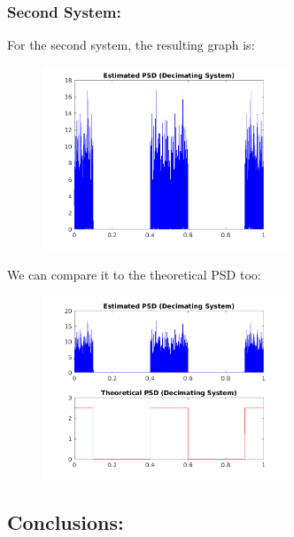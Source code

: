 \documentclass[a4paper,11pt]{article}
\begin{document}
\newpage

\subsubsection{Second System:}

For the second system, the resulting graph is:

\begin{figure}[!hp]
    \begin{center}
      \includegraphics[width=0.65\textwidth]{images/study4/R_es_d.png}
    \end{center}
\end{figure}

We can compare it to the theoretical PSD too:

\begin{figure}[!hp]
    \begin{center}
      \includegraphics[width=0.65\textwidth]{images/study4/comp_psd_d.png}
    \end{center}
\end{figure}

\newpage

\subsection{Conclusions:}
\end{document}
